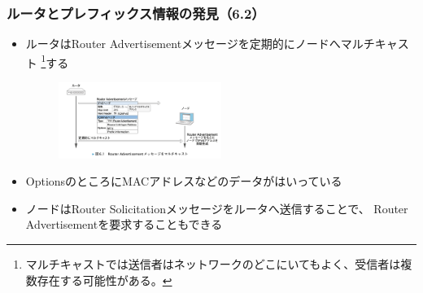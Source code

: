 \begin{frame}
  \frametitle{ルータとプレフィックス情報の発見（6.2）}

  \begin{itemize}
    \item ルータはRouter Advertisementメッセージを定期的にノードへマルチキャスト%
    \footnote{マルチキャストでは送信者はネットワークのどこにいてもよく、受信者は複数存在する可能性がある。}する
    \begin{center}
      \begin{figure}
        \includegraphics[width=0.5\textwidth]{img/figure6_1.png}
      \end{figure}
    \end{center}

    \item OptionsのところにMACアドレスなどのデータがはいっている

    \item ノードはRouter Solicitationメッセージをルータへ送信することで、
    Router Advertisementを要求することもできる
  \end{itemize}
\end{frame}

